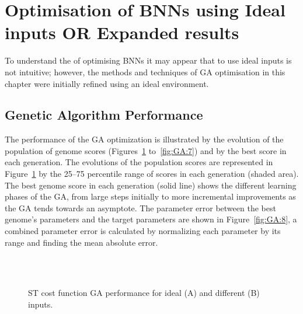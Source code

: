\section{Optimisation of BNNs using Ideal inputs \textbf{OR} Expanded results}

To understand the of optimising BNNs it may appear that to use ideal
inputs is not intuitive; however, the methods and techniques of GA
optimisation in this chapter were initially refined using an ideal
environment.



\subsection{Genetic Algorithm Performance}



The performance of the GA optimization is illustrated by the evolution
of the population of genome scores (Figures~\ref{fig:GA:5}
to~\ref{fig:GA:7}) and by the best score in each generation. The
evolutions of the population scores are represented in
Figure~\ref{fig:GA:5} by the 25--75 percentile range of scores in each
generation (shaded area). The best genome score in each generation
(solid line) shows the different learning phases of the GA, from large
steps initially to more incremental improvements as the GA tends
towards an asymptote. The parameter error between the best genome's
parameters and the target parameters are shown in Figure~\ref{fig:GA:8},
a combined parameter error is calculated by normalizing each parameter
by its range and finding the mean absolute error.

\smallskip{}

\begin{figure}[htb]
\hspace{2.2in} \hfill \\
\hfill\\
 \caption{ST cost function GA performance for ideal (A) and different (B) inputs.}\label{fig:GA:5}
\end{figure}

\begin{figure}[ht!]
\hspace{2.2in} \hfill \\
\hfill\\
 \caption{}\label{fig:GA:6}
\end{figure}

